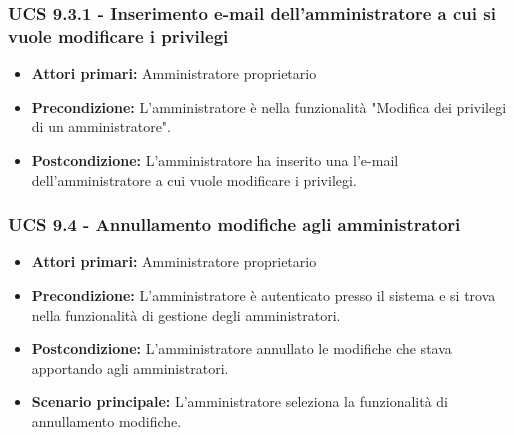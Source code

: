 \subsubsection{UCS 9.3.1 - Inserimento e-mail dell'amministratore a cui si vuole modificare i privilegi}%
\begin{itemize}
\item \textbf{Attori primari:} Amministratore proprietario
\item \textbf{Precondizione:} L'amministratore è nella funzionalità "Modifica dei privilegi di un amministratore".
\item \textbf{Postcondizione:} L'amministratore ha inserito una l'e-mail dell'amministratore a cui vuole modificare i privilegi.
\end{itemize}

\subsubsection{UCS 9.4 - Annullamento modifiche agli amministratori}%

\begin{itemize}
\item \textbf{Attori primari:} Amministratore proprietario
\item \textbf{Precondizione:} L'amministratore è autenticato presso il sistema e si trova nella funzionalità di gestione degli amministratori.
\item \textbf{Postcondizione:} L'amministratore annullato le modifiche che stava apportando agli amministratori.
\item \textbf{Scenario principale:} L'amministratore seleziona la funzionalità di annullamento modifiche.
\end{itemize}